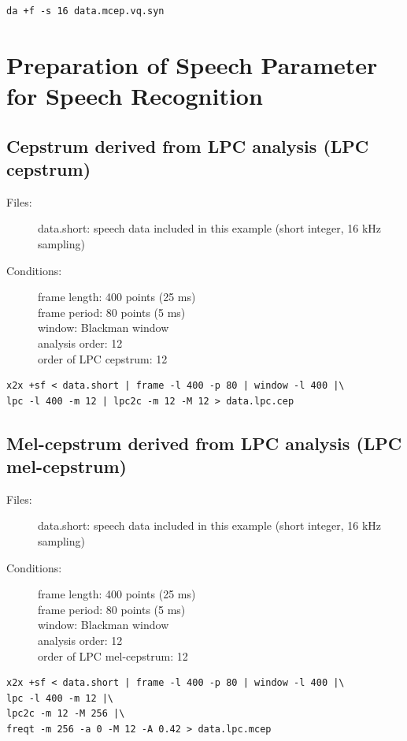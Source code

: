 \documentclass[a4paper,10pt]{article}
\begin{document}
\begin{verbatim}
da +f -s 16 data.mcep.vq.syn
\end{verbatim}

\section{Preparation of Speech Parameter for Speech Recognition}

\subsection{Cepstrum derived from LPC analysis (LPC cepstrum)}

\begin{description}
\item[Files:] 
  data.short: speech data included in this example (short integer, 16 kHz sampling)
\item[Conditions:]
  frame length: 400 points (25 ms)\\
  frame period: 80 points (5 ms)\\
  window: Blackman window\\
  analysis order: 12\\
  order of LPC cepstrum: 12
\end{description}

\begin{verbatim}
x2x +sf < data.short | frame -l 400 -p 80 | window -l 400 |\
lpc -l 400 -m 12 | lpc2c -m 12 -M 12 > data.lpc.cep
\end{verbatim}

\subsection{Mel-cepstrum derived from LPC analysis
  (LPC mel-cepstrum)}

\begin{description}
\item[Files:]
  data.short: speech data included in this example (short integer, 16 kHz sampling)
\item[Conditions:]
  frame length: 400 points (25 ms)\\
  frame period: 80 points (5 ms)\\
  window: Blackman window\\
  analysis order: 12\\
  order of LPC mel-cepstrum: 12
\end{description}

\begin{verbatim}
x2x +sf < data.short | frame -l 400 -p 80 | window -l 400 |\
lpc -l 400 -m 12 |\
lpc2c -m 12 -M 256 |\
freqt -m 256 -a 0 -M 12 -A 0.42 > data.lpc.mcep
\end{verbatim}
\end{document}
